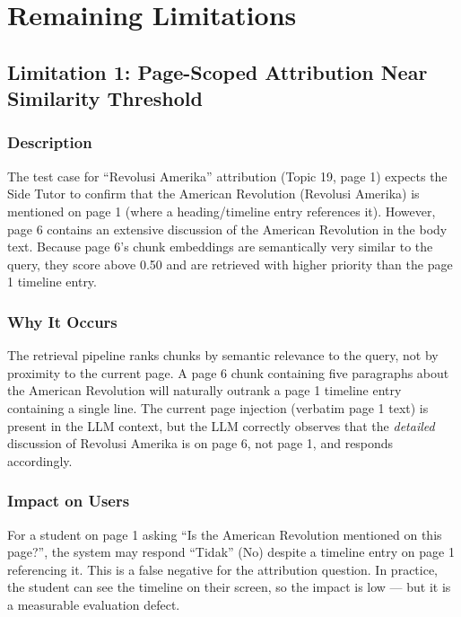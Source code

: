 \documentclass[12pt, a4paper]{report}
\begin{document}
\chapter{Remaining Limitations}

\section{Limitation 1: Page-Scoped Attribution Near Similarity Threshold}
\label{sec:limit1}

\subsection{Description}

The test case for ``Revolusi Amerika'' attribution (Topic 19, page 1) expects
the Side Tutor to confirm that the American Revolution (Revolusi Amerika) is
mentioned on page 1 (where a heading/timeline entry references it). However,
page 6 contains an extensive discussion of the American Revolution in the body
text. Because page 6's chunk embeddings are semantically very similar to the
query, they score above 0.50 and are retrieved with higher priority than the
page 1 timeline entry.

\subsection{Why It Occurs}

The retrieval pipeline ranks chunks by semantic relevance to the query, not by
proximity to the current page. A page 6 chunk containing five paragraphs about
the American Revolution will naturally outrank a page 1 timeline entry
containing a single line. The current page injection (verbatim page 1 text)
is present in the LLM context, but the LLM correctly observes that the
\emph{detailed} discussion of Revolusi Amerika is on page 6, not page 1, and
responds accordingly.

\subsection{Impact on Users}

For a student on page 1 asking ``Is the American Revolution mentioned on this
page?'', the system may respond ``Tidak'' (No) despite a timeline entry on
page 1 referencing it. This is a false negative for the attribution question.
In practice, the student can see the timeline on their screen, so the impact is
low — but it is a measurable evaluation defect.
\end{document}
